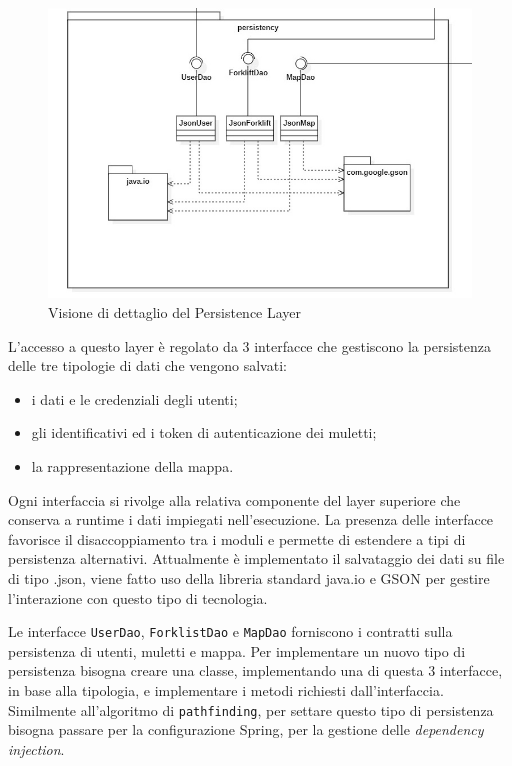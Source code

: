 \begin{figure}[H]
	\centering
	\includegraphics[scale=0.50]{res/diagrams/server/server_persistency.jpg}
	\caption{Visione di dettaglio del Persistence Layer}
\end{figure}

L'accesso a questo layer è regolato da 3 interfacce che gestiscono la persistenza delle tre tipologie di dati che vengono salvati:
\begin{itemize}
	\item i dati e le credenziali degli utenti;
	\item gli identificativi ed i token di autenticazione dei muletti;
	\item la rappresentazione della mappa.
\end{itemize}

Ogni interfaccia si rivolge alla relativa componente del layer superiore che conserva a runtime i dati impiegati nell'esecuzione. La presenza delle interfacce favorisce il disaccoppiamento tra i moduli e permette di estendere a tipi di persistenza alternativi. Attualmente è implementato il salvataggio dei dati su file di tipo .json, viene fatto uso della libreria standard java.io e GSON per gestire l'interazione con questo tipo di tecnologia.

        Le interfacce \texttt{UserDao}, \texttt{ForklistDao} e \texttt{MapDao} forniscono i contratti sulla persistenza di utenti, muletti e mappa. Per implementare un nuovo tipo di persistenza bisogna creare una classe, implementando una di questa 3 interfacce, in base alla tipologia, e implementare i metodi richiesti dall'interfaccia.
        Similmente all'algoritmo di \texttt{pathfinding}, per settare questo tipo di persistenza bisogna passare per la configurazione Spring, per la gestione delle \textit{dependency injection}.


\pagebreak
